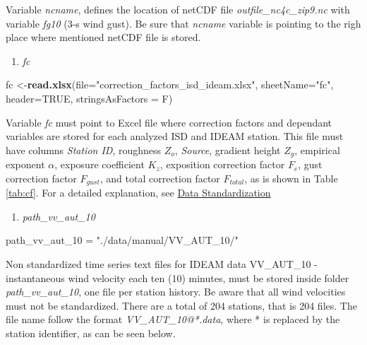 \documentclass[12pt,oneside]{reedthesis}
\newenvironment{Shaded}{\begin{snugshade}}{\end{snugshade}}
\newcommand{\DataTypeTok}[1]{\textcolor[rgb]{0.13,0.29,0.53}{#1}}
\newcommand{\DecValTok}[1]{\textcolor[rgb]{0.00,0.00,0.81}{#1}}
\newcommand{\KeywordTok}[1]{\textcolor[rgb]{0.13,0.29,0.53}{\textbf{#1}}}
\newcommand{\NormalTok}[1]{#1}
\newcommand{\OtherTok}[1]{\textcolor[rgb]{0.56,0.35,0.01}{#1}}
\newcommand{\StringTok}[1]{\textcolor[rgb]{0.31,0.60,0.02}{#1}}
\providecommand{\tightlist}{%
  \setlength{\itemsep}{0pt}\setlength{\parskip}{0pt}}
\begin{document}
Variable \emph{ncname}, defines the location of netCDF file \emph{outfile\_nc4c\_zip9.nc} with variable \emph{fg10} (3-s wind gust). Be sure that \emph{ncname} variable is pointing to the righ place where mentioned netCDF file is stored.
\begin{enumerate}
\def\labelenumi{\arabic{enumi}.}
\setcounter{enumi}{3}
\tightlist
\item
  \emph{fc}
\end{enumerate}
\scriptsize

\vspace{0.4cm}
\begin{Shaded}
\begin{Highlighting}[]
\NormalTok{      fc <-}\KeywordTok{read.xlsx}\NormalTok{(}\DataTypeTok{file=}\StringTok{"correction_factors_isd_ideam.xlsx"}\NormalTok{, }\DataTypeTok{sheetName=}\StringTok{"fc"}\NormalTok{, }\DataTypeTok{header=}\OtherTok{TRUE}\NormalTok{, }
                     \DataTypeTok{stringsAsFactors =}\NormalTok{ F)}
\end{Highlighting}
\end{Shaded}
\normalsize

Variable \emph{fc} must point to Excel file where correction factors and dependant variables are stored for each analyzed ISD and IDEAM station. This file must have columns \emph{Station ID}, roughness \(Z_o\), \emph{Source}, gradient height \(Z_g\), empirical exponent \(\alpha\), exposure coefficient \(K_z\), exposition correction factor \(F_e\), gust correction factor \(F_{gust}\), and total correction factor \(F_{total}\), as is shown in Table \ref{tab:cf}. For a detailed explanation, see \protect\hyperlink{rmd-standardization}{Data Standardization}
\begin{enumerate}
\def\labelenumi{\arabic{enumi}.}
\setcounter{enumi}{4}
\tightlist
\item
  \emph{path\_vv\_aut\_10}
\end{enumerate}
\scriptsize

\vspace{0.4cm}
\begin{Shaded}
\begin{Highlighting}[]
\NormalTok{      path_vv_aut_}\DecValTok{10}\NormalTok{ =}\StringTok{ "./data/manual/VV_AUT_10/"}
\end{Highlighting}
\end{Shaded}
\normalsize

Non standardized time series text files for IDEAM data VV\_AUT\_10 - instantaneous wind velocity each ten (10) minutes, must be stored inside folder \emph{path\_vv\_aut\_10}, one file per station history. Be aware that all wind velocities must not be standardized. There are a total of 204 stations, that is 204 files. The file name follow the format \emph{VV\_AUT\_10@*.data}, where * is replaced by the station identifier, as can be seen below.
\end{document}
